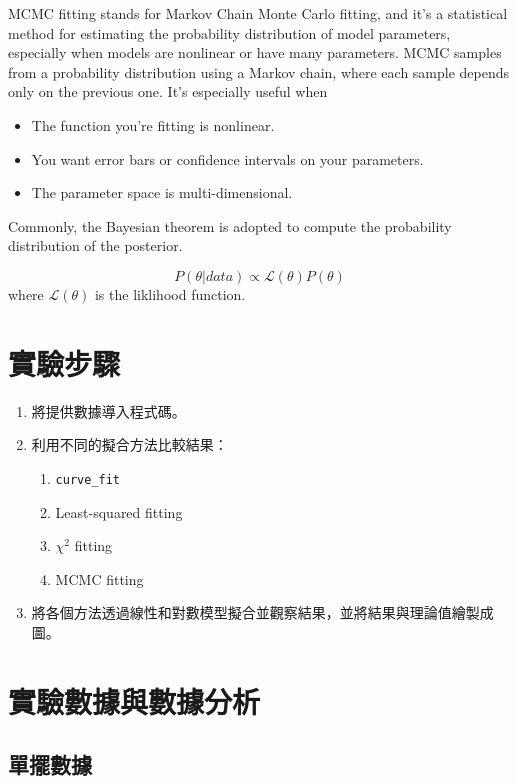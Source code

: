 \documentclass[12pt,a4paper]{article}
\begin{document}
\begin{CJK}{UTF8}{bkai}
MCMC fitting stands for Markov Chain Monte Carlo fitting, and it's a statistical method for estimating the probability distribution of model parameters, especially when models are nonlinear or have many parameters. MCMC samples from a probability distribution using a Markov chain, where each sample depends only on the previous one. It’s especially useful when
\begin{itemize}
    \item The function you’re fitting is nonlinear.
    \item You want error bars or confidence intervals on your parameters.
    \item The parameter space is multi-dimensional.
\end{itemize}

Commonly, the Bayesian theorem is adopted to compute the probability distribution of the posterior.

\begin{equation}
    P(\theta|data)\propto \mathcal{L}(\theta) P(\theta)
\end{equation}
where $\mathcal{L}(\theta)$ is the liklihood function. 

\section{實驗步驟}
\begin{enumerate}
    \item 將提供數據導入程式碼。
    \item 利用不同的擬合方法比較結果：
    \begin{enumerate}
        \item \texttt{curve\_fit}
        \item Least-squared fitting
        \item $\chi^2$ fitting
        \item MCMC fitting
    \end{enumerate}
    \item 將各個方法透過線性和對數模型擬合並觀察結果，並將結果與理論值繪製成圖。
\end{enumerate}

\section{實驗數據與數據分析}
\subsection{單擺數據}
\hfill


\end{CJK}
\end{document}
